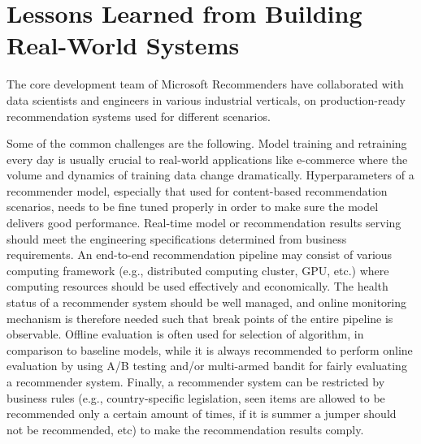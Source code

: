\section{Lessons Learned from Building Real-World Systems} 

The core development team of Microsoft Recommenders have collaborated with data scientists and engineers 
in various industrial verticals, on production-ready recommendation systems used for different scenarios. 

Some of the common challenges %
are the following. Model training and retraining every day is usually crucial to real-world applications like e-commerce where the volume and dynamics of training data change dramatically. Hyperparameters of a recommender model, especially that used for content-based recommendation scenarios, needs to be fine tuned properly in order to make sure the model delivers good performance.
Real-time model or recommendation results serving should meet the engineering specifications determined from business requirements. An end-to-end recommendation pipeline may consist of various computing framework (e.g., distributed computing cluster, GPU, etc.) where computing resources should be used effectively and economically. 
The health status of a recommender system should be well managed, and online monitoring mechanism is therefore needed such that break points of the entire pipeline is observable. 
Offline evaluation is often used for selection of algorithm, in comparison to baseline models, while it is always recommended to perform online evaluation by using A/B testing and/or multi-armed bandit for fairly evaluating a recommender system. 
Finally, a recommender system can be restricted by business rules (e.g., country-specific legislation, seen items are allowed to be recommended only a certain amount of times, if it is summer a jumper should not be recommended, etc) to make the recommendation results comply.

